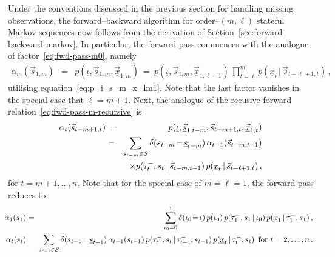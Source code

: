 \documentclass[a4paper]{article}
\newcommand{\ui}{\underline{\iota}}
\newcommand{\tm}{\tau^{-}}
\newcommand{\vs}{\vec{s}}
\newcommand{\uvs}{\underline{\vs}}
\newcommand{\vx}{\vec{x}}
\newcommand{\uvx}{\underline{\vx}}
\newcommand{\ux}{\underline{x}}
\newcommand{\us}{\underline{s}}
\begin{document}
Under the conventions discussed in the previous section for handling missing observations, the forward--backward algorithm for order--$(m,\ell)$ stateful Markov sequences now follows from the derivation of Section~\ref{sec:forward-backward-markov}.
In particular, the forward pass commences with the analogue of factor~\eqref{eq:fwd-pass-m0}, namely
\begin{eqnarray}
\alpha_m(\vs_{1,m}) & = & p(\ui, \vs_{1,m}, \uvx_{1,m})
~=~p(\ui,\vs_{1,m},\uvx_{1,\ell-1})
\,\prod_{t=\ell}^{m}p(\ux_t\,|\,\vs_{t-\ell+1,t})\,,
\end{eqnarray}
utilising equation~\eqref{eq:p_i_s_m_x_lm1}. Note that the last factor vanishes in the special case that $\ell=m+1$.
Next, the analogue of the recusive forward relation~\eqref{eq:fwd-pass-m-recursive} is
\begin{eqnarray}
\alpha_{t}(\vs_{t-m+1,t}) & = &
 p(\ui, \uvs_{1,t-m},\vs_{t-m+1,t}, \uvx_{1,t})
\nonumber\\& = &
\sum_{s_{t-m}\in{\cal S}} \delta(s_{t-m}\!=\!\us_{t-m})\,\alpha_{t-1}(\vs_{t-m,t-1})
\nonumber\\&&\times
p(\tm_{t},s_{t}\,|\,\vs_{t-m,t-1})\,p(\ux_{t}\,|\,\vs_{t-\ell+1,t})\,,
\label{alpha_t:stateful}
\end{eqnarray}
for $t=m+1,\ldots,n$.
Note that for the special case of $m=\ell=1$, the forward pass reduces to
\begin{eqnarray}
\!\!\!
\alpha_1(s_1) & = &  \sum_{\iota_0=0}^{1}\delta(\iota_0\!=\!\ui)\,
p(\iota_0)\,p(\tm_1,s_1\,|\,\iota_0)\,p(\ux_1\,|\,\tm_1,s_1)\,,
\nonumber\\
\!\!\!
\alpha_{t}(s_{t}) & = &
\!\!\!\sum_{s_{t-1}\in{\cal S}} \delta(s_{t-1}\!=\!\us_{t-1})\,\alpha_{t-1}(s_{t-1})
\,p(\tm_{t},s_{t}\,|\,\tm_{t-1},s_{t-1})\,p(\ux_t\,|\,\tm_t,s_t)
\,\mbox{ for $t=2,\ldots,n$}
\,.
\end{eqnarray}
\end{document}
